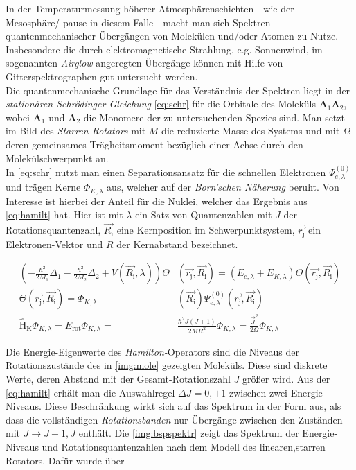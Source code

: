 \documentclass[numbers=noenddot,a4paper,notitlepage,twoside,BCOR15mm]{scrartcl}
\newcommand{\ix}[1]{_\text{#1}}
\newcommand{\tilt}[1]{\textit{#1}}
\newcommand{\fett}[1]{\textbf{#1}}
\newcommand{\OP}[1]{\hat{\mathrm{#1}}}
\begin{document}
		In der Temperaturmessung höherer Atmosphärenschichten - wie der Mesosphäre/-pause in diesem Falle -  macht man sich Spektren quantenmechanischer Übergängen von Molekülen und/oder Atomen zu Nutze. Insbesondere die durch elektromagnetische Strahlung, e.g. Sonnenwind, im sogenannten \tilt{Airglow} angeregten Übergänge können mit Hilfe von Gitterspektrographen gut untersucht werden.\\
		Die quantenmechanische Grundlage für das Verständnis der Spektren liegt in der \tilt{stationären Schrödinger-Gleichung} \autoref{eq:schr} für die Orbitale des Moleküls $\fett{A}\ix{1}\fett{A}\ix{2}$, wobei $\fett{A}\ix{1}$ und $\fett{A}\ix{2}$ die Monomere der zu untersuchenden Spezies sind. Man setzt im Bild des \tilt{Starren Rotators} mit $M$ die reduzierte Masse des Systems und mit $\Omega$ deren gemeinsames Trägheitsmoment bezüglich einer Achse durch den Molekülschwerpunkt an.\\
		In \autoref{eq:schr} nutzt man einen Separationsansatz für die schnellen Elektronen $\Psi_{e,\lambda}^{(0)}$ und trägen Kerne $\Phi_{K,\lambda}$ aus, welcher auf der \tilt{Born'schen Näherung} beruht. Von Interesse ist hierbei der Anteil für die Nuklei, welcher das Ergebnis aus \autoref{eq:hamilt} hat. Hier ist mit $\lambda$ ein Satz von Quantenzahlen mit $J$ der Rotationsquantenzahl, $\vec{R\ix{i}}$ eine Kernposition im Schwerpunktsystem, $\vec{r\ix{j}}$ ein Elektronen-Vektor und $R$ der Kernabstand bezeichnet.

			\begin{align}
				\left(-\frac{\hbar^2}{2M\ix{1}}\Delta\ix{1}-\frac{\hbar^2}{2M\ix{2}}\Delta\ix{2}+V(\vec{R\ix{i}},\lambda)\right)\Theta&(\vec{r\ix{j}},\vec{R\ix{i}})=\left(E_{e,\lambda}+E_{K,\lambda}\right)\Theta(\vec{r\ix{j}},\vec{R\ix{i}}) \label{eq:schr}\\
				\Theta(\vec{r\ix{j}},\vec{R\ix{i}})=\Phi_{K,\lambda}&(\vec{R\ix{i}})\Psi_{e,\lambda}^{(0)}(\vec{r\ix{j}},\vec{R\ix{i}}) \nonumber \\
				\OP{H}\ix{K}\Phi_{K,\lambda}=E\ix{rot}\Phi_{K,\lambda}=&\frac{\hbar^2J\left(J+1\right)}{2MR^2}\Phi_{K,\lambda}=\frac{\vec{J}^2}{2\Omega}\Phi_{K,\lambda} \label{eq:hamilt}
			\end{align}

		Die Energie-Eigenwerte des \tilt{Hamilton-}Operators sind die Niveaus der Rotationszustände des in \autoref{img:mole} gezeigten Moleküls. Diese sind diskrete Werte, deren Abstand mit der Gesamt-Rotationszahl $J$ größer wird. Aus der \autoref{eq:hamilt} erhält man die Auswahlregel $\Delta J=0,\pm1$ zwischen zwei Energie-Niveaus. Diese Beschränkung wirkt sich auf das Spektrum in der Form aus, als dass die vollständigen \tilt{Rotationsbanden} nur Übergänge zwischen den Zuständen mit $J\rightarrow J\pm1,J$ enthält. Die \autoref{img:bspspektr} zeigt das Spektrum der Energie-Niveaus und Rotationsquantenzahlen nach dem Modell des linearen,starren Rotators. Dafür wurde über
\end{document}
